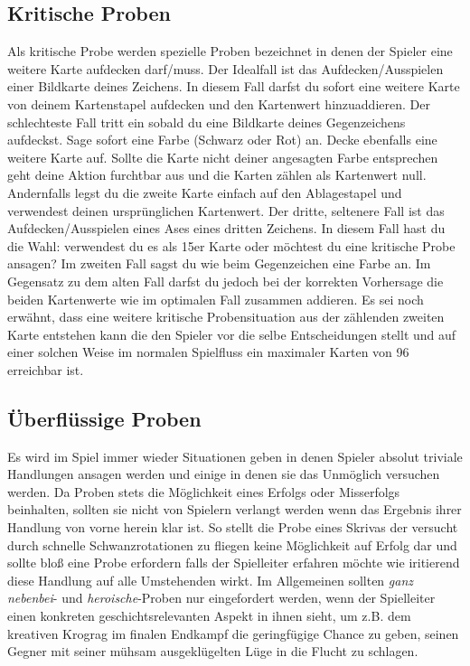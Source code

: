 \subsection*{Kritische Proben}
Als kritische Probe werden spezielle Proben bezeichnet in denen der Spieler eine weitere Karte aufdecken darf/muss. Der Idealfall ist das Aufdecken/Ausspielen einer Bildkarte deines Zeichens. In diesem Fall darfst du sofort eine weitere Karte von deinem Kartenstapel aufdecken und den Kartenwert hinzuaddieren. Der schlechteste Fall tritt ein sobald du eine Bildkarte deines Gegenzeichens aufdeckst. Sage sofort eine Farbe (Schwarz oder Rot) an. Decke ebenfalls eine weitere Karte auf. Sollte die Karte nicht deiner angesagten Farbe entsprechen geht deine Aktion furchtbar aus und die Karten zählen als Kartenwert null. Andernfalls legst du die zweite Karte einfach auf den Ablagestapel und verwendest deinen ursprünglichen Kartenwert. Der dritte, seltenere Fall ist das Aufdecken/Ausspielen eines Ases eines dritten Zeichens. In diesem Fall hast du die Wahl: verwendest du es als 15er Karte oder möchtest du eine kritische Probe ansagen? Im zweiten Fall sagst du wie beim Gegenzeichen eine Farbe an. Im Gegensatz zu dem alten Fall darfst du jedoch bei der korrekten Vorhersage die beiden Kartenwerte wie im optimalen Fall zusammen addieren. Es sei noch erwähnt, dass eine weitere kritische Probensituation aus der zählenden zweiten Karte entstehen kann die den Spieler vor die selbe Entscheidungen stellt und auf einer solchen Weise im normalen Spielfluss ein maximaler Karten von 96 erreichbar ist. \\

\subsection*{Überflüssige Proben}
Es wird im Spiel immer wieder Situationen geben in denen Spieler absolut triviale Handlungen ansagen werden und einige in denen sie das Unmöglich versuchen werden. Da Proben stets die Möglichkeit eines Erfolgs oder Misserfolgs beinhalten, sollten sie nicht von Spielern verlangt werden wenn das Ergebnis ihrer Handlung von vorne herein klar ist. So stellt die Probe eines Skrivas der versucht durch schnelle Schwanzrotationen zu fliegen keine Möglichkeit auf Erfolg dar und sollte bloß eine Probe erfordern falls der Spielleiter erfahren möchte wie iritierend diese Handlung auf alle Umstehenden wirkt. Im Allgemeinen sollten \textit{ganz nebenbei}- und \textit{heroische}-Proben nur eingefordert werden, wenn der Spielleiter einen konkreten geschichtsrelevanten Aspekt in ihnen sieht, um z.B. dem kreativen Krograg im finalen Endkampf die geringfügige Chance zu geben, seinen Gegner mit seiner mühsam ausgeklügelten Lüge in die Flucht zu schlagen.

